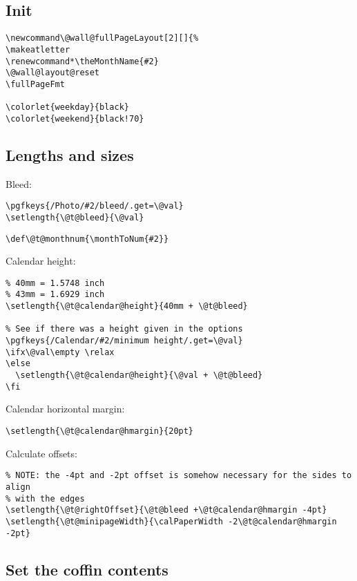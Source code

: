 \documentclass[11pt,oneside]{memoir-article}
\begin{document}
\subsection{Init}
\label{sec:org28b2a27}

\begin{verbatim}
\newcommand\@wall@fullPageLayout[2][]{%
\makeatletter
\renewcommand*\theMonthName{#2}
\@wall@layout@reset
\fullPageFmt

\colorlet{weekday}{black}
\colorlet{weekend}{black!70}
\end{verbatim}

\subsection{Lengths and sizes}
\label{sec:orge5a9400}

Bleed:

\begin{verbatim}
\pgfkeys{/Photo/#2/bleed/.get=\@val}
\setlength{\@t@bleed}{\@val}
\end{verbatim}

\begin{verbatim}
\def\@t@monthnum{\monthToNum{#2}}
\end{verbatim}

Calendar height:

\begin{verbatim}
% 40mm = 1.5748 inch
% 43mm = 1.6929 inch
\setlength{\@t@calendar@height}{40mm + \@t@bleed}

% See if there was a height given in the options
\pgfkeys{/Calendar/#2/minimum height/.get=\@val}
\ifx\@val\empty \relax
\else
  \setlength{\@t@calendar@height}{\@val + \@t@bleed}
\fi
\end{verbatim}

Calendar horizontal margin:

\begin{verbatim}
\setlength{\@t@calendar@hmargin}{20pt}
\end{verbatim}

Calculate offsets:

\begin{verbatim}
% NOTE: the -4pt and -2pt offset is somehow necessary for the sides to align
% with the edges
\setlength{\@t@rightOffset}{\@t@bleed +\@t@calendar@hmargin -4pt}
\setlength{\@t@minipageWidth}{\calPaperWidth -2\@t@calendar@hmargin -2pt}
\end{verbatim}

\subsection{Set the coffin contents}
\label{sec:orgf5b7748}
\end{document}
